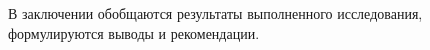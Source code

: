 
В заключении обобщаются результаты выполненного исследования, формулируются
выводы и рекомендации.

